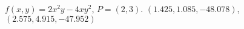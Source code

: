 {$f(x,y) = 2x^2y-4xy^2$,   $P=(2,3)$.\label{12_06_ex_13a}
}
{
$(1.425, 1.085, -48.078)$, $(2.575, 4.915, -47.952)$
}